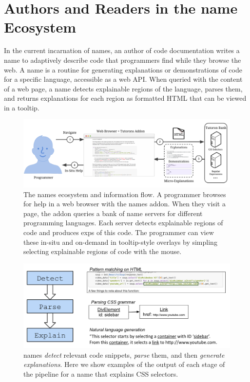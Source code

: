 \section{Authors and Readers in the \Gls{name} Ecosystem}

In the current incarnation of \Glspl{name}, an author of code documentation writes a \Gls{name} to adaptively describe  code that programmers find while they browse the web.
A \Gls{name} is a routine for generating explanations or demonstrations of code for a specific language, accessible as a web API\@.
When queried with the content of a web page, a \Gls{name} detects explainable regions of the language, parses them, and returns explanations for each region as formatted HTML that can be viewed in a tooltip.

\begin{figure}
    \includegraphics[width=\columnwidth]{figures/tutoron_ecosystem}
    \caption{%
    The \Glspl{name} ecosystem and information flow.
    A programmer browses for help in a web browser with the \Glspl{name} addon.
    When they visit a page, the addon queries a bank of \Gls{name} servers for different programming languages.
    Each server detects explainable regions of code and produces \glspl{exp} of this code.
    The programmer can view these in-situ and on-demand in tooltip-style overlays by simpling selecting explainable regions of code with the mouse.
    }\label{fig:tutoron_ecosystem}
\end{figure}

\begin{figure}
\centering
    \includegraphics[width=\columnwidth]{figures/explanation_pipeline}
    \caption{\Glspl{name} \emph{detect} relevant code snippets, \emph{parse} them, and then \emph{generate explanations}.  Here we show examples of the output of each stage of the pipeline for a \Gls{name} that explains CSS selectors.}\label{fig:explanation_pipeline}
\end{figure}
\fi

